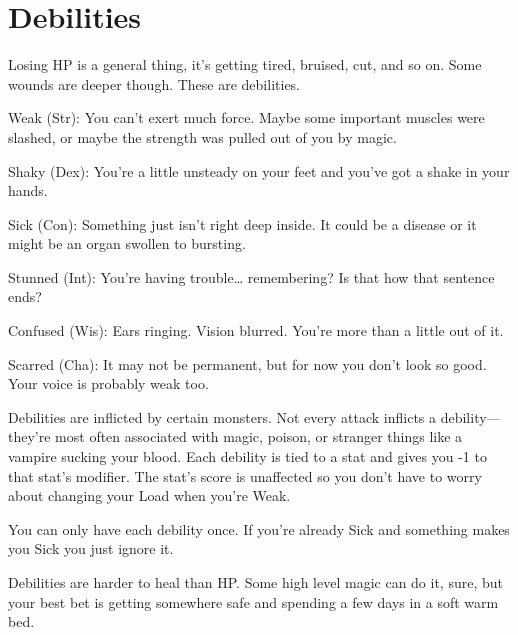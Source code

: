        
\section{Debilities}   
       

Losing HP is a general thing, it's getting tired, bruised, cut, and so on. Some wounds are deeper though. These are debilities.

       
\startitemize[1,packed]
         
\item Weak (Str): You can't exert much force. Maybe some important muscles were slashed, or maybe the strength was pulled out of you by magic.

         
\item Shaky (Dex): You're a little unsteady on your feet and you've got a shake in your hands.

         
\item Sick (Con): Something just isn't right deep inside. It could be a disease or it might be an organ swollen to bursting.

         
\item Stunned (Int): You're having trouble… remembering? Is that how that sentence ends?

         
\item Confused (Wis): Ears ringing. Vision blurred. You're more than a little out of it.

         
\item Scarred (Cha): It may not be permanent, but for now you don't look so good. Your voice is probably weak too.

       
\stopitemize
       

Debilities are inflicted by certain monsters. Not every attack inflicts a debility—they're most often associated with magic, poison, or stranger things like a vampire sucking your blood. Each debility is tied to a stat and gives you -1 to that stat's modifier. The stat's score is unaffected so you don't have to worry about changing your Load when you're Weak.

       

You can only have each debility once. If you're already Sick and something makes you Sick you just ignore it.

       

Debilities are harder to heal than HP. Some high level magic can do it, sure, but your best bet is getting somewhere safe and spending a few days in a soft warm bed.

